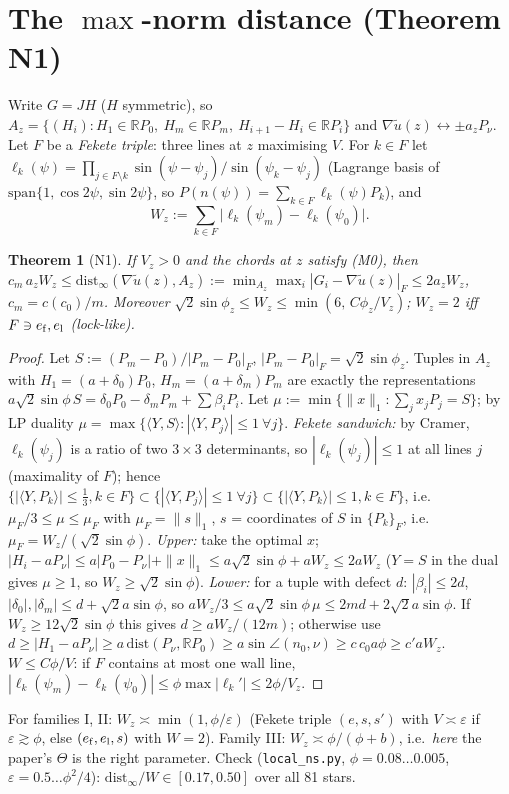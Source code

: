 \documentclass[11pt]{article}
\newtheorem{theorem}{Theorem}
\theoremstyle{remark}
\newcommand{\norm}[1]{\|#1\|}
\begin{document}
\section{The $\max$-norm distance (Theorem N1)}\label{sec:N1}
Write $G=JH$ ($H$ symmetric), so $A_z=\{(H_i):H_1\in\mathbb RP_0,\ H_m\in\mathbb RP_m,\ H_{i+1}-H_i\in\mathbb RP_i\}$ and
$\nabla\tilde u(z)\leftrightarrow\pm a_zP_\nu$. Let $F$ be a \emph{Fekete triple}: three lines at $z$ maximising $V$. For $k\in F$ let
$\ell_k(\psi)=\prod_{j\in F\setminus k}\sin(\psi-\psi_j)/\sin(\psi_k-\psi_j)$ (Lagrange basis of $\mathrm{span}\{1,\cos2\psi,\sin2\psi\}$,
so $P(n(\psi))=\sum_{k\in F}\ell_k(\psi)P_k$), and
\[
W_z:=\sum_{k\in F}\big|\ell_k(\psi_m)-\ell_k(\psi_0)\big| .
\]
\begin{theorem}[N1]\label{thm:N1}
If $V_z>0$ and the chords at $z$ satisfy (M0), then
$c_m\,a_zW_z\le\mathrm{dist}_\infty(\nabla\tilde u(z),A_z):=\min_{A_z}\max_i|G_i-\nabla\tilde u(z)|_F\le 2a_zW_z$,
$c_m=c(c_0)/m$. Moreover $\sqrt2\sin\phi_z\le W_z\le\min(6,\,C\phi_z/V_z)$; $W_z=2$ iff $F\ni e_{\rm f},e_{\rm l}$ (lock-like).
\end{theorem}
\begin{proof}
Let $S:=(P_m-P_0)/|P_m-P_0|_F$, $|P_m-P_0|_F=\sqrt2\sin\phi_z$. Tuples in $A_z$ with $H_1=(a+\delta_0)P_0$, $H_m=(a+\delta_m)P_m$
are exactly the representations $a\sqrt2\sin\phi\,S=\delta_0P_0-\delta_mP_m+\sum\beta_iP_i$. Let
$\mu:=\min\{\norm x_1:\sum_jx_jP_j=S\}$; by LP duality $\mu=\max\{\langle Y,S\rangle:|\langle Y,P_j\rangle|\le1\ \forall j\}$.
\emph{Fekete sandwich:} by Cramer, $\ell_k(\psi_j)$ is a ratio of two $3\times3$ determinants, so $|\ell_k(\psi_j)|\le1$ at all lines $j$
(maximality of $F$); hence $\{|\langle Y,P_k\rangle|\le\tfrac13,k\in F\}\subset\{|\langle Y,P_j\rangle|\le1\ \forall j\}\subset\{|\langle Y,P_k\rangle|\le1,k\in F\}$,
i.e.\ $\mu_F/3\le\mu\le\mu_F$ with $\mu_F=\norm{s}_1$, $s$ = coordinates of $S$ in $\{P_k\}_F$, i.e.\ $\mu_F=W_z/(\sqrt2\sin\phi)$.
\emph{Upper:} take the optimal $x$; $|H_i-aP_\nu|\le a|P_0-P_\nu|+\norm{x}_1\le a\sqrt2\sin\phi+aW_z\le2aW_z$
($Y=S$ in the dual gives $\mu\ge1$, so $W_z\ge\sqrt2\sin\phi$).
\emph{Lower:} for a tuple with defect $d$: $|\beta_i|\le2d$, $|\delta_{0}|,|\delta_m|\le d+\sqrt2a\sin\phi$, so
$aW_z/3\le a\sqrt2\sin\phi\,\mu\le 2md+2\sqrt2a\sin\phi$. If $W_z\ge12\sqrt2\sin\phi$ this gives $d\ge aW_z/(12m)$; otherwise use
$d\ge|H_1-aP_\nu|\ge a\,\mathrm{dist}(P_\nu,\mathbb RP_0)\ge a\sin\angle(n_0,\nu)\ge c\,c_0a\phi\ge c'aW_z$.
$W\le C\phi/V$: if $F$ contains at most one wall line, $|\ell_k(\psi_m)-\ell_k(\psi_0)|\le\phi\max|\ell_k'|\le2\phi/V_z$.
\end{proof}
For families I, II: $W_z\asymp\min(1,\phi/\varepsilon)$ (Fekete triple $(e,s,s')$ with $V\asymp\varepsilon$ if $\varepsilon\gtrsim\phi$,
else $(e_{\rm f},e_{\rm l},s)$ with $W=2$). Family III: $W_z\asymp\phi/(\phi+b)$, i.e.\ \emph{here} the paper's $\Theta$ is the right
parameter. Check (\texttt{local\_ns.py}, $\phi=0.08\dots0.005$, $\varepsilon=0.5\dots\phi^2/4$): $\mathrm{dist}_\infty/W\in[0.17,0.50]$ over all 81 stars.
\end{document}
